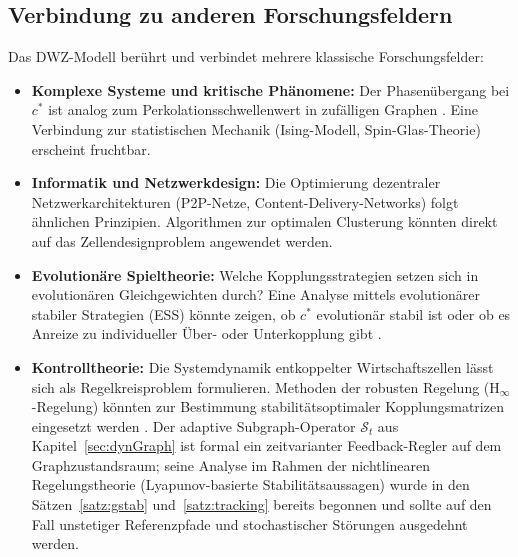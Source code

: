 \documentclass[a4paper, 12pt, twoside, openright]{report}
\theoremstyle{definition}
\theoremstyle{definition}
\begin{document}
\subsection{Verbindung zu anderen Forschungsfeldern}

Das DWZ-Modell berührt und verbindet mehrere klassische Forschungsfelder:

\begin{itemize}
    \item \textbf{Komplexe Systeme und kritische Phänomene:} Der Phasenübergang bei $c^*$
          ist analog zum Perkolationsschwellenwert in zufälligen Graphen
          \citep{erdos1960evolution}. Eine Verbindung zur statistischen Mechanik
          (Ising-Modell, Spin-Glas-Theorie) erscheint fruchtbar.

    \item \textbf{Informatik und Netzwerkdesign:} Die Optimierung dezentraler
          Netzwerkarchitekturen (P2P-Netze, Content-Delivery-Networks) folgt ähnlichen
          Prinzipien. Algorithmen zur optimalen Clusterung \citep{luxburg2007spectral}
          könnten direkt auf das Zellendesignproblem angewendet werden.

    \item \textbf{Evolutionäre Spieltheorie:} Welche Kopplungsstrategien setzen sich
          in evolutionären Gleichgewichten durch? Eine Analyse mittels evolutionärer
          stabiler Strategien (ESS) könnte zeigen, ob $c^*$ evolutionär stabil ist
          oder ob es Anreize zu individueller Über- oder Unterkopplung gibt
          \citep{maynardsmith1982evolution}.

    \item \textbf{Kontrolltheorie:} Die Systemdynamik entkoppelter Wirtschaftszellen
          lässt sich als Regelkreisproblem formulieren. Methoden der robusten Regelung
          (H$_\infty$-Regelung) könnten zur Bestimmung stabilitätsoptimaler
          Kopplungsmatrizen eingesetzt werden \citep{zhou1996robust}. Der adaptive
          Subgraph-Operator $\mathcal{S}_t$ aus Kapitel~\ref{sec:dynGraph} ist
          formal ein zeitvarianter Feedback-Regler auf dem Graphzustandsraum;
          seine Analyse im Rahmen der nichtlinearen Regelungstheorie
          (Lyapunov-basierte Stabilitätsaussagen) wurde in den Sätzen~\ref{satz:gstab}
          und~\ref{satz:tracking} bereits begonnen und sollte auf den Fall
          unstetiger Referenzpfade und stochastischer Störungen ausgedehnt werden.


\end{itemize}
\end{document}
